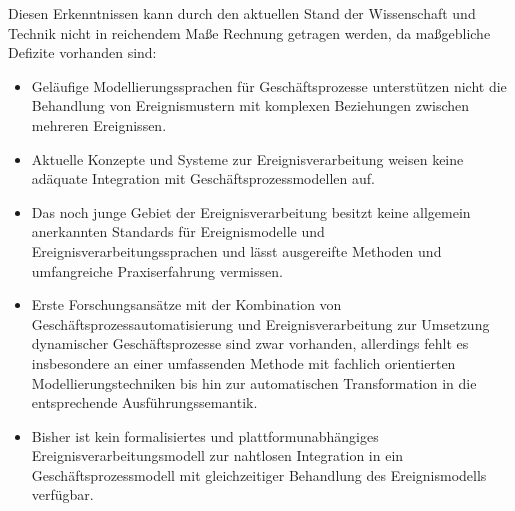 Diesen Erkenntnissen kann durch den aktuellen Stand der Wissenschaft und Technik nicht in
reichendem Maße Rechnung getragen werden, da maßgebliche Defizite vorhanden sind:
\begin{itemize}
	\item
	Geläufige Modellierungssprachen für Geschäftsprozesse unterstützen nicht die Behandlung von Ereignismustern mit komplexen Beziehungen zwischen mehreren Ereignissen.
    \item 
    Aktuelle Konzepte und Systeme zur Ereignisverarbeitung weisen keine adäquate Integration mit Geschäftsprozessmodellen auf.
    \item
    Das noch junge Gebiet der Ereignisverarbeitung besitzt keine allgemein anerkannten Standards für Ereignismodelle und Ereignisverarbeitungssprachen und lässt ausgereifte Methoden und umfangreiche Praxiserfahrung vermissen.
    \item
    Erste Forschungsansätze mit der Kombination von Geschäftsprozessautomatisierung und Ereignisverarbeitung zur Umsetzung dynamischer Geschäftsprozesse sind zwar vorhanden, allerdings fehlt es insbesondere an einer umfassenden Methode mit fachlich orientierten Modellierungstechniken bis hin zur automatischen Transformation in die entsprechende Ausführungssemantik.
    \item
    Bisher ist kein formalisiertes und plattformunabhängiges Ereignisverarbeitungsmodell zur nahtlosen Integration in ein Geschäftsprozessmodell mit gleichzeitiger Behandlung des Ereignismodells verfügbar.
\end{itemize}

